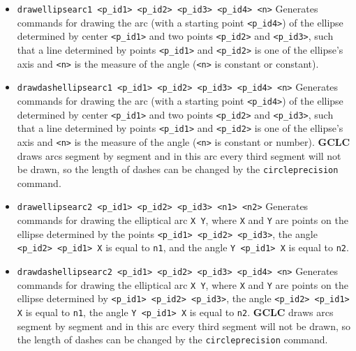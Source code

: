 \documentclass[a4paper]{book}
\newcommand{\gclc}{{\bfseries GCLC}\xspace}
\begin{document}
\begin{itemize}
\item \verb|drawellipsearc1 <p_id1> <p_id2> <p_id3> <p_id4> <n>|
        Generates commands for drawing the arc (with a starting
        point \verb|<p_id4>|) of the ellipse
        determined by center \verb|<p_id1>| and two points
        \verb|<p_id2>| and \verb|<p_id3>|, such that a line
        determined by points \verb|<p_id1>| and \verb|<p_id2>|
        is one of the ellipse's axis and \verb|<n>| is the measure of
        the angle (\verb|<n>| is constant or {\sc constant}).

\item \verb|drawdashellipsearc1 <p_id1> <p_id2> <p_id3> <p_id4> <n>|
        Generates com\-mands for drawing the arc (with a starting
        point \verb|<p_id4>|) of the ellipse
        determined by center \verb|<p_id1>| and two points
        \verb|<p_id2>| and \verb|<p_id3>|, such that a line
        determined by points \verb|<p_id1>| and \verb|<p_id2>|
        is one of the ellipse's axis and \verb|<n>| is the measure of
        the angle (\verb|<n>| is constant or {\sc number}).
        \gclc draws arcs segment by segment and in this arc
        every third segment will not be drawn, so the length
        of dashes can be changed by the \verb|circleprecision| command.


\item \verb|drawellipsearc2 <p_id1> <p_id2> <p_id3> <n1> <n2>|
        Generates commands for drawing the elliptical arc
        \verb|X Y|, where \verb|X| and \verb|Y| are points on
        the ellipse determined by the points \verb|<p_id1> <p_id2> <p_id3>|,
        the angle \verb|<p_id2> <p_id1> X| is equal to \verb|n1|, and
        the angle \verb|Y <p_id1> X| is equal to \verb|n2|.

\item \verb|drawdashellipsearc2 <p_id1> <p_id2> <p_id3> <p_id4> <n>|
        Generates commands for drawing the elliptical arc
        \verb|X Y|, where \verb|X| and \verb|Y| are points on
        the ellipse determined by \verb|<p_id1> <p_id2> <p_id3>|,
        the angle \verb|<p_id2> <p_id1> X| is equal to \verb|n1|,
        the angle \verb|Y <p_id1> X| is equal to \verb|n2|.
        \gclc draws arcs segment by segment and in this arc
        every third segment will not be drawn, so the length of
        dashes can be changed by the \verb|circleprecision| command.


\end{itemize}
\end{document}
